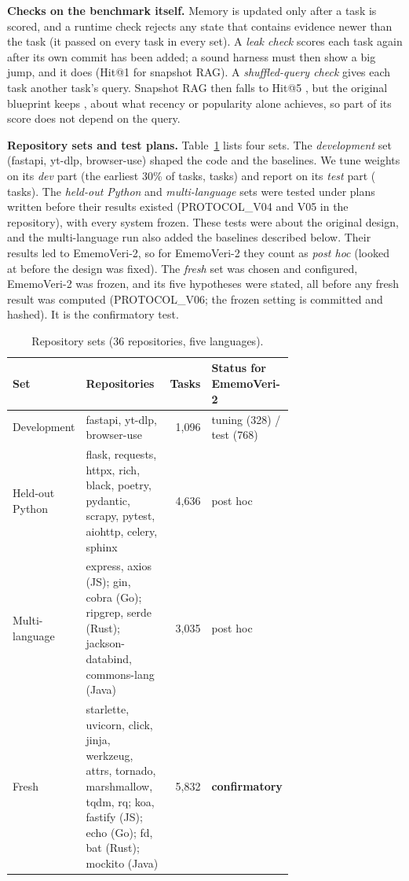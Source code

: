 \documentclass[runningheads]{llncs}
\newcommand{\sys}{EmemoVeri}
\begin{document}
\begin{table}[t]\centering\footnotesize\setlength{\tabcolsep}{3pt}
\resizebox{\linewidth}{!}{}
\caption{Development repositories and task selection. Clock anomalies are commits whose recorded timestamp is earlier than the running clock.}
\label{tab:data}
\end{table}

\textbf{Checks on the benchmark itself.} Memory is updated only after a task is scored, and a runtime check rejects any state that contains evidence newer than the task (it passed on every task in every set). A \emph{leak check} scores each task again after its own commit has been added; a sound harness must then show a big jump, and it does (Hit@1 \leakSnapOne{} for snapshot RAG). A \emph{shuffled-query check} gives each task another task's query. Snapshot RAG then falls to Hit@5 \shufSnapFive{}, but the original blueprint keeps \shufEmvFive{}, about what recency or popularity alone achieves, so part of its score does not depend on the query.

\textbf{Repository sets and test plans.} Table~\ref{tab:sets} lists four sets. The \emph{development} set (fastapi, yt-dlp, browser-use) shaped the code and the baselines. We tune weights on its \emph{dev} part (the earliest 30\% of tasks, \nDev{} tasks) and report on its \emph{test} part (\nTest{} tasks). The \emph{held-out Python} and \emph{multi-language} sets were tested under plans written before their results existed (PROTOCOL\_V04 and V05 in the repository), with every system frozen. These tests were about the original design, and the multi-language run also added the baselines described below. Their results led to \sys{}-2, so for \sys{}-2 they count as \emph{post hoc} (looked at before the design was fixed). The \emph{fresh} set was chosen and configured, \sys{}-2 was frozen, and its five hypotheses were stated, all before any fresh result was computed (PROTOCOL\_V06; the frozen setting is committed and hashed). It is the confirmatory test.

\begin{table}[t]\centering\footnotesize\setlength{\tabcolsep}{3pt}
\begin{tabular}{@{}l p{0.55\linewidth} r p{0.16\linewidth}@{}}
\toprule
Set & Repositories & Tasks & Status for \sys{}-2 \\
\midrule
Development & fastapi, yt-dlp, browser-use & 1{,}096 & tuning (328) / test (768) \\
Held-out Python & flask, requests, httpx, rich, black, poetry, pydantic, scrapy, pytest, aiohttp, celery, sphinx & 4{,}636 & post hoc \\
Multi-language & express, axios (JS); gin, cobra (Go); ripgrep, serde (Rust); jackson-databind, commons-lang (Java) & 3{,}035 & post hoc \\
Fresh & starlette, uvicorn, click, jinja, werkzeug, attrs, tornado, marshmallow, tqdm, rq; koa, fastify (JS); echo (Go); fd, bat (Rust); mockito (Java) & 5{,}832 & \textbf{confirmatory} \\
\bottomrule
\end{tabular}
\caption{Repository sets (36 repositories, five languages).}
\label{tab:sets}
\end{table}
\end{document}
